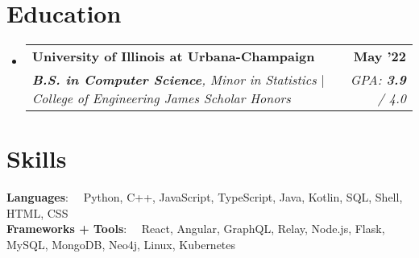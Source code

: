 \documentclass[letterpaper,11pt]{article}
\makeatletter
\newcommand{\resumeItem}[1]{
  \item\small{
    {#1 \vspace{-1pt}}
  }
}
\newcommand{\resumeSubheading}[4]{
  \vspace{-0pt}
  \item
    \begin{tabular*}{1\textwidth}[t]{l@{\extracolsep{\fill}}r}
      \large{\textbf{#1}} & \small{\color{main}\textbf{#2}} \\
      \textit{\small#3} & \textit{\small#4} \\
    \end{tabular*}\vspace{-7pt}
}
\newcommand{\resumeSubSubheading}[2]{
    \item
    \begin{tabular*}{0.97\textwidth}{l@{\extracolsep{\fill}}r}
      \textit{\small#1} & \textit{\small #2} \\
    \end{tabular*}\vspace{-7pt}
}
\newcommand{\resumeProjectHeading}[2]{
  \vspace{-0pt}
    \item
    \begin{tabular*}{1\textwidth}{l@{\extracolsep{\fill}}r}
      \small\textbf{#1} & \small{\color{main}\textbf{#2}} \\
    \end{tabular*}\vspace{-7pt}
}
\newcommand{\resumeSubHeadingListStart}{\begin{itemize}[leftmargin=0in, label={}]}
\newcommand{\resumeSubHeadingListEnd}{\end{itemize}}
\newcommand{\resumeItemListStart}{\begin{itemize}}
\newcommand{\resumeItemListEnd}{\end{itemize}\vspace{0pt}}
\makeatother
\begin{document}



\section{Education}
\vspace{-3pt}
\resumeSubHeadingListStart
\resumeSubheading
{University of Illinois at Urbana-Champaign}{May '22} %
{\textnormal{\textbf{B.S. in Computer Science}, Minor in Statistics $|$ College of Engineering James Scholar Honors}}
{\textnormal{GPA: \textbf{3.9} / 4.0}}
\resumeSubHeadingListEnd

\section{Skills}
\vspace{-4pt}
\begin{itemize}[leftmargin=0in, label={}]
  \small{\item{
        \textbf{\hspace{13.77mm}  Languages}{: \ \ Python, C++, JavaScript, TypeScript, Java, Kotlin, SQL, Shell, HTML, CSS} \\
        \textbf{Frameworks + Tools}{: \ \ React, Angular, GraphQL, Relay, Node.js, Flask, MySQL, MongoDB, Neo4j, Linux, Kubernetes}}}
\end{itemize}


\end{document}

